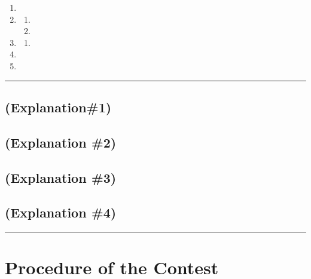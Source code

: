\documentclass[draft]{report}
\newenvironment{expl}[0]%
  {\rule{\textwidth}{.2pt}\footnotesize}%
  {\rule{\textwidth}{.2pt}\normalsize}
\begin{document}
\begin{enumerate}
\item

\item


  \begin{enumerate}
  \item
  
  \item
  
  \end{enumerate}

\item


  \begin{enumerate}
  \item
  
  \end{enumerate}

\item

\item

\end{enumerate}

\begin{expl}
\section{(Explanation\#1)}\label{explantion1}


\section{(Explanation \#2)}\label{explanation-2-2}


\section{(Explanation \#3)}\label{explanation-3-2}


\section{(Explanation \#4)}\label{explanation-4-1}

\end{expl}


\chapter{Procedure of the Contest}\label{procedure-of-the-contest}
\end{document}
